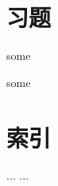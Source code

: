 
\section*{习题}\label{1-1}

\begin{exe}
some
\end{exe}

\begin{exe}
some
\end{exe}


\section*{索引}\label{1-1}
\begin{Glossary}
\item[...] ...
\end{Glossary}




